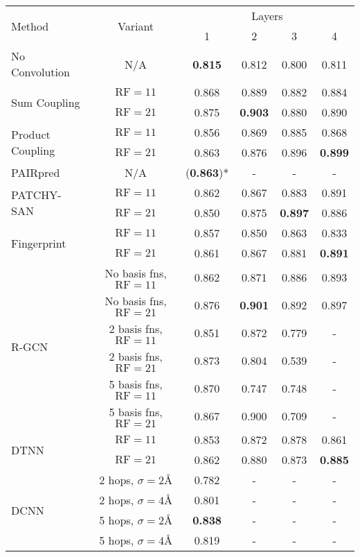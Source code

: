 \begin{table}
	\begin{center}
		\begin{tabular}{l c c c c c }
			\toprule
			
			
			\multirow{2}{*}{Method} & \multirow{2}{*}{Variant} &  \multicolumn{4}{c}{Layers} \\
			& & 1 & 2 & 3 & 4 \\
			
			\midrule
			No Convolution & N/A & \textbf{0.815} & 0.812 & 0.800 & 0.811 \\
			\midrule
			\multirow{2}{*}{Sum Coupling} & $\text{RF}=11$ & 0.868 & 0.889 & 0.882 & 0.884 \\
			& $\text{RF}=21$ & 0.875 & \textbf{0.903} & 0.880 & 0.890 \\
			\midrule
			\multirow{2}{*}{Product Coupling} & $\text{RF}=11$ & 0.856 & 0.869 & 0.885 & 0.868 \\
			& $\text{RF}=21$ & 0.863 & 0.876 & 0.896 & \textbf{0.899} \\
			\midrule
			PAIRpred~\cite{minhas2014}   & N/A  & (\textbf{0.863})* & - & - & - \\
			
			\midrule
			\multirow{2}{*}{PATCHY-SAN~\cite{niepert2016}}  & $\text{RF}=11$ & 0.862 & 0.867 & 0.883 & 0.891 \\
			& $\text{RF}=21$ & 0.850 & 0.875 & \textbf{0.897} & 0.886 \\
			\midrule
			\multirow{2}{*}{Fingerprint~\cite{duvenaud2015}}  & $\text{RF}=11$ & 0.857 & 0.850 & 0.863 & 0.833 \\
			& $\text{RF}=21$ & 0.861 & 0.867 & 0.881 & \textbf{0.891} \\
			\midrule
			
			\multirow{6}{*}{R-GCN~\cite{schlichtkrull2017}} & No basis fns, $\text{RF}=11$ & 0.862 & 0.871 & 0.886 & 0.893 \\
			& No basis fns, $\text{RF}=21$ & 0.876 & \textbf{0.901} & 0.892 & 0.897 \\
			& 2 basis fns, $\text{RF}=11$ & 0.851 & 0.872 & 0.779 & -	   \\
			& 2 basis fns, $\text{RF}=21$ & 0.873 & 0.804 & 0.539 & -     \\
			& 5 basis fns, $\text{RF}=11$ & 0.870 & 0.747 & 0.748 & -	   \\
			& 5 basis fns, $\text{RF}=21$ & 0.867 & 0.900 & 0.709 & -     \\
			\midrule
			\multirow{2}{*}{DTNN~\cite{schutt2017}}& $\text{RF}=11$ & 0.853 & 0.872 & 0.878 & 0.861 \\
			& $\text{RF}=21$ & 0.862 & 0.880 & 0.873 & \textbf{0.885} \\
			\midrule
			\multirow{4}{*}{DCNN~\cite{atwood2016}} & 2 hops, $\sigma=2$\AA{} & 0.782 & - & - & - \\
			& 2 hops, $\sigma=4$\AA{} & 0.801 & - & - & - \\
			& 5 hops, $\sigma=2$\AA{} & \textbf{0.838} & - & - & - \\ 
			& 5 hops, $\sigma=4$\AA{} & 0.819 & - & - & - \\ 
			

\end{tabular}
\end{center}
\end{table}
